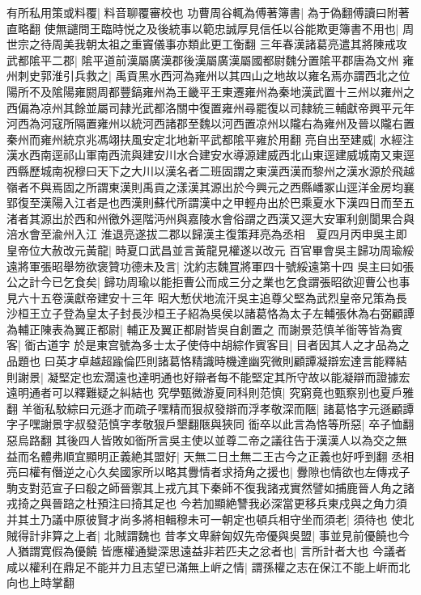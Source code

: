 有所私用策或料覆|{
	料音聊覆審校也}
功曹周谷輒為傅著簿書|{
	為于偽翻傅讀曰附著直略翻}
使無譴問王臨時悦之及後統事以範忠誠厚見信任以谷能欺更簿書不用也|{
	周世宗之待周美我朝太祖之重竇儀事亦類此更工衡翻}
三年春漢諸葛亮遣其將陳戒攻武都隂平二郡|{
	隂平道前漢屬廣漢郡後漢屬廣漢屬國都尉魏分置隂平郡唐為文州}
雍州刺史郭淮引兵救之|{
	禹貢黑水西河為雍州以其四山之地故以雍名焉亦謂西北之位陽所不及隂陽雍閼周都豐鎬雍州為王畿平王東遷雍州為秦地漢武置十三州以雍州之西偏為凉州其餘並屬司隷光武都洛關中復置雍州尋罷復以司隸統三輔獻帝興平元年河西為河寇所隔置雍州以統河西諸郡至魏以河西置凉州以隴右為雍州及晉以隴右置秦州而雍州統京兆馮翊扶風安定北地新平武都隂平雍於用翻}
亮自出至建威|{
	水經注漢水西南逕祁山軍南西流與建安川水合建安水導源建威西北山東逕建威城南又東逕西縣歷城南祝穆曰天下之大川以漢名者二班固謂之東漢西漢而黎州之漢水源於飛越嶺者不與焉固之所謂東漢則禹貢之漾漢其源出於今興元之西縣嶓冢山逕洋金房均襄郢復至漢陽入江者是也西漢則蘇代所謂漢中之甲輕舟出於巴乘夏水下漢四日而至五渚者其源出於西和州徼外逕階沔州與嘉陵水會俗謂之西漢又逕大安軍利劍閬果合與涪水會至渝州入江}
淮退亮遂拔二郡以歸漢主復策拜亮為丞相　夏四月丙申吳主即皇帝位大赦改元黃龍|{
	時夏口武昌並言黃龍見權遂以改元}
百官畢會吳主歸功周瑜綏遠將軍張昭舉笏欲褒贊功德未及言|{
	沈約志魏罝將軍四十號綏遠第十四}
吳主曰如張公之計今已乞食矣|{
	歸功周瑜以能拒曹公而成三分之業也乞食謂張昭欲迎曹公也事見六十五卷漢獻帝建安十三年}
昭大慙伏地流汗吳主追尊父堅為武烈皇帝兄策為長沙桓王立子登為皇太子封長沙桓王子紹為吳侯以諸葛恪為太子左輔張休為右弼顧譚為輔正陳表為翼正都尉|{
	輔正及翼正都尉皆吳自創置之}
而謝景范慎羊衜等皆為賓客|{
	衜古道字}
於是東宫號為多士太子使侍中胡綜作賓客目|{
	目者因其人之才品為之品題也}
曰英才卓越超踰倫匹則諸葛恪精識時機達幽究微則顧譚凝辯宏達言能釋結則謝景|{
	凝堅定也宏濶遠也達明通也好辯者每不能堅定其所守故以能凝辯而證據宏遠明通者可以釋難疑之糾結也}
究學甄微游夏同科則范慎|{
	究窮竟也甄察别也夏戶雅翻}
羊衜私駮綜曰元遜才而疏子嘿精而狠叔發辯而浮孝敬深而陿|{
	諸葛恪字元遜顧譚字子嘿謝景字叔發范慎字孝敬狠戶墾翻陿與狹同}
衜卒以此言為恪等所惡|{
	卒子恤翻惡烏路翻}
其後四人皆敗如衜所言吳主使以並尊二帝之議往告于漢漢人以為交之無益而名體弗順宜顯明正義絶其盟好|{
	天無二日土無二王古今之正義也好呼到翻}
丞相亮曰權有僭逆之心久矣國家所以略其釁情者求掎角之援也|{
	釁隙也情欲也左傳戎子駒支對范宣子曰殽之師晉禦其上戎亢其下秦師不復我諸戎實然譬如捕鹿晉人角之諸戎掎之與晉踣之杜預注曰掎其足也}
今若加顯絶讐我必深當更移兵東戍與之角力須并其土乃議中原彼賢才尚多將相輯穆未可一朝定也頓兵相守坐而須老|{
	須待也}
使北賊得計非算之上者|{
	北賊謂魏也}
昔孝文卑辭匈奴先帝優與吳盟|{
	事並見前優饒也今人猶謂寛假為優饒}
皆應權通變深思遠益非若匹夫之忿者也|{
	言所計者大也}
今議者咸以權利在鼎足不能并力且志望已滿無上㟁之情|{
	謂孫權之志在保江不能上㟁而北向也上時掌翻}

